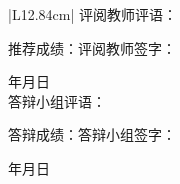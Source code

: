 \documentclass[a4paper,zihao=-4]{ctexart}
\begin{document}
{\songti
\begin{center}
\begin{tabular}{|L{12.84cm}|}
\hline
评阅教师评语：\par
\vspace{5.0cm}
推荐成绩：\hspace{2.5cm}\hspace{1cm}评阅教师签字：\hspace{3.2cm}\par
\vspace{0.5cm}
年\hspace{1cm}月\hspace{1cm}日 \\
\hline
答辩小组评语：\par
\vspace{5.0cm}
答辩成绩：\hspace{2.5cm}\hspace{1cm}答辩小组签字：\hspace{2.8cm}\par
\vspace{0.5cm}
年\hspace{1cm}月\hspace{1cm}日 \\
\hline
\end{tabular}
\end{center}
}
\end{document}
